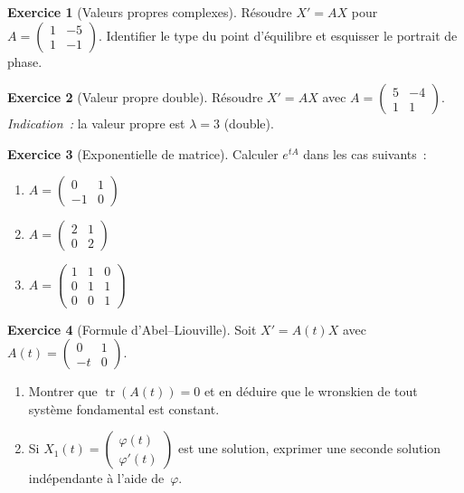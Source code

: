 \documentclass[12pt,a4paper,openany]{book}
\theoremstyle{definition}
\newtheorem{exercice}{Exercice}[chapter]
\theoremstyle{plain}
\theoremstyle{remark}
\DeclareMathOperator{\tr}{tr}
\begin{document}
\begin{exercice}[Valeurs propres complexes]\label{exo:syst-complexe}
  Résoudre $X' = AX$ pour $A = \begin{pmatrix} 1 & -5 \\ 1 & -1 \end{pmatrix}$.
  Identifier le type du point d'équilibre et esquisser le portrait de phase.
\end{exercice}

\begin{exercice}[Valeur propre double]\label{exo:syst-jordan}
  Résoudre $X' = AX$ avec $A = \begin{pmatrix} 5 & -4 \\ 1 & 1 \end{pmatrix}$.
  \emph{Indication~:} la valeur propre est $\lambda = 3$ (double).
\end{exercice}

\begin{exercice}[Exponentielle de matrice]\label{exo:exp-matrice}
  Calculer $e^{tA}$ dans les cas suivants~:
  \begin{enumerate}[label=\alph*)]
    \item $A = \begin{pmatrix} 0 & 1 \\ -1 & 0 \end{pmatrix}$
    \item $A = \begin{pmatrix} 2 & 1 \\ 0 & 2 \end{pmatrix}$
    \item $A = \begin{pmatrix} 1 & 1 & 0 \\ 0 & 1 & 1 \\ 0 & 0 & 1 \end{pmatrix}$
  \end{enumerate}
\end{exercice}

\begin{exercice}[Formule d'Abel--Liouville]\label{exo:abel-liouville}
  Soit $X' = A(t)X$ avec $A(t) = \begin{pmatrix} 0 & 1 \\ -t & 0 \end{pmatrix}$.
  \begin{enumerate}[label=\alph*)]
    \item Montrer que $\tr(A(t)) = 0$ et en déduire que le wronskien
      de tout système fondamental est constant.
    \item Si $X_1(t) = \begin{pmatrix}\varphi(t)\\\varphi'(t)\end{pmatrix}$
      est une solution, exprimer une seconde solution indépendante à l'aide
      de~$\varphi$.
  \end{enumerate}
\end{exercice}
\end{document}
